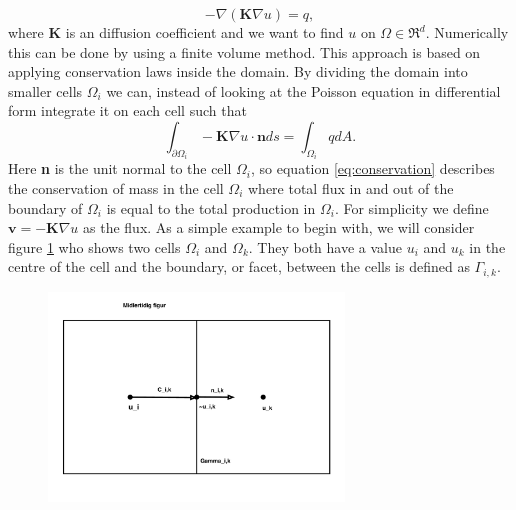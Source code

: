 \begin{equation}
    -\nabla(\textbf{K}\nabla u) = q,
    \label{eq:Poisson}
\end{equation}
where \textbf{K} is an diffusion coefficient and we want to find $u$ on $\Omega \in \Re^d$. Numerically this can be done by using a finite volume method. This approach is based on applying conservation laws inside the domain. By dividing the domain into smaller cells $\Omega_i$ we can, instead of looking at the Poisson equation in differential form integrate it on each cell such that
\begin{equation}
    \int_{\partial\Omega_i} - \textbf{K} \nabla u \cdot \textbf{n} ds = \int_{\Omega_i} q dA.
    \label{eq:conservation}
\end{equation}
Here \textbf{n} is the unit normal to the cell $\Omega_i$, so equation \eqref{eq:conservation} describes the conservation of mass in the cell $\Omega_i$ where total flux in and out of the boundary of $\Omega_i$ is equal to the total production in $\Omega_i$. For simplicity we define $\textbf{v} = - \textbf{K} \nabla u$ as the flux. As a simple example to begin with, we will consider figure \ref{fig:gridTwoCells} who shows two cells $\Omega_i$ and $\Omega_k$. They both have a value $u_i$ and $u_k$ in the centre of the cell and the boundary, or facet, between the cells is defined as $\Gamma_{i,k}$.
\begin{figure}[htb]
    \centering
    \includegraphics[width = 0.7\textwidth]{figures/grid_two_cells.pdf}
    \caption{}
    \label{fig:gridTwoCells}
\end{figure}


